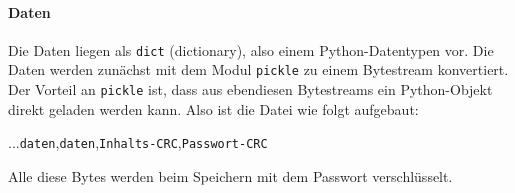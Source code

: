 \documentclass[a4paper,11pt]{article}
\begin{document}
\paragraph{Daten} Die Daten liegen als \texttt{dict} (dictionary), also einem Python-Datentypen vor. Die Daten werden zunächst mit dem Modul \texttt{pickle}
zu einem Bytestream konvertiert. Der Vorteil an \texttt{pickle} ist, dass aus ebendiesen Bytestreams ein Python-Objekt direkt geladen werden kann.
\newline\noindent
Also ist die Datei wie folgt aufgebaut:
\begin{center}
	...\texttt{daten},\texttt{daten},\texttt{Inhalts-CRC},\texttt{Passwort-CRC}
\end{center}
Alle diese Bytes werden beim Speichern mit dem Passwort verschlüsselt.
\end{document}
